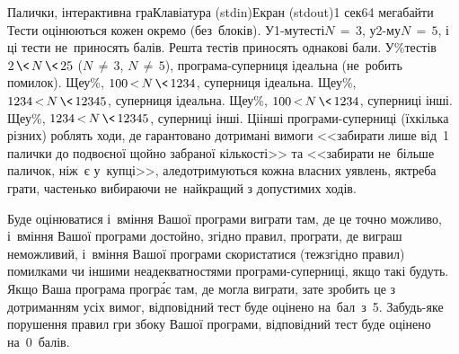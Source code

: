\begin{problem}{Палички, інтерактивна гра}{Клавіатура (stdin)}{Екран (stdout)}{1 сек}{64 мегабайти}
\Scoring
Тести оцінюються кожен окремо (без~блоків).
У\nolinebreak[3] \mbox{1-му}\nolinebreak[2] тесті\nolinebreak[2] ${N\,{=}\,3}$, 
у\nolinebreak[3] \mbox{2-му}\nolinebreak[2] ${N\,{=}\,5}$,
і ці тести не~приносять балів.
Решта тестів приносять однакові бали.
У\%\nolinebreak[3] тестів ${2\,{\<}\,N\,{\<}\,25}$ (${N\,{\neq}\,3}$, ${N\,{\neq}\,5}$), програма-суперниця ідеальна (не~робить помилок).
Ще\nolinebreak[3] у\%, ${100\,{<}\,N\,{\<}\,1234}$, суперниця ідеальна.
Ще\nolinebreak[3] у\%, ${1234\,{<}\,N\,{\<}\,12345}$, суперниця ідеальна.
Ще\nolinebreak[3] у\%, ${100\,{<}\,N\,{\<}\,1234}$, суперниці інші.
Ще\nolinebreak[3] у\%, ${1234\,{<}\,N\,{\<}\,12345}$, суперниці інші. 
Ці\nolinebreak[3] інші програми-суперниці (їх\nolinebreak[3] кілька різних) роблять ходи, де гарантовано дотримані вимоги <<забирати лише від~1 палички до подвоєної щойно забраної кількості>> та <<забирати не~більше паличок, ніж~є у~купці>>, але\nolinebreak[2] дотримуються кожна власних уявлень, як\nolinebreak[2] треба грати, частенько вибираючи не~найкра\-щий з допустимих ходів.

Буде оцінюватися і~вміння Вашої програми виграти там, де це точно можливо,
і~вміння Вашої програми достойно, згідно правил, програти, де виграш неможливий, 
і~вміння Вашої програми скористатися (теж\nolinebreak[2] згідно правил) помилками чи іншими неадекватностями програми-суперниці, якщо такі будуть.
Якщо Ваша програма прогр\'{а}є там, де могла виграти, зате зробить це з дотриманням усіх вимог,
відповідний тест буде оцінено на~бал~з~5.
За\nolinebreak[3] будь-яке порушення правил гри з\nolinebreak[3] боку Вашої програми, відповідний тест буде оцінено на~0~балів.

{
\Examples

\ifAfour
\vspace{-\baselineskip}
\fi

}
\end{problem}
